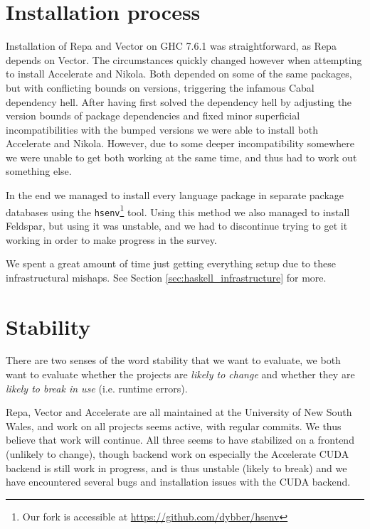 \section{Installation process}


Installation of Repa and Vector on GHC 7.6.1 was straightforward, as Repa
depends on Vector. The circumstances quickly changed however when attempting
to install Accelerate and Nikola. Both depended on some of the same packages,
but with conflicting bounds on versions, triggering the infamous Cabal
dependency hell. After having first solved the dependency hell by adjusting the
version bounds of package dependencies and fixed minor superficial
incompatibilities with the bumped versions we were able to install both
Accelerate and Nikola. However, due to some deeper incompatibility somewhere we
were unable to get both working at the same time, and thus had to work out
something else.

In the end we managed to install every language package in separate package
databases using the \texttt{hsenv}\footnote{Our fork is accessible at
\url{https://github.com/dybber/hsenv}} tool.  Using this method we also managed
to install Feldspar, but using it was unstable, and we had to discontinue
trying to get it working in order to make progress in the survey.

We spent a great amount of time just getting everything setup due to these
infrastructural mishaps. See Section \ref{sec:haskell_infrastructure} for more.

\section{Stability}

There are two senses of the word stability that we want to evaluate,
we both want to evaluate whether the projects are \emph{likely to
  change} and whether they are \emph{likely to break in use}
(i.e. runtime errors).

Repa, Vector and Accelerate are all maintained at the University of
New South Wales, and work on all projects seems active, with regular
commits. We thus believe that work will continue. All three seems to
have stabilized on a frontend (unlikely to change), though backend
work on especially the Accelerate CUDA backend is still work in
progress, and is thus unstable (likely to break) and we have
encountered several bugs and installation issues with the CUDA
backend.

